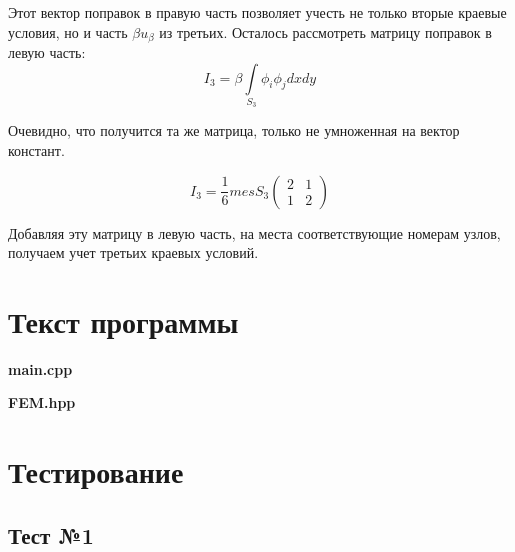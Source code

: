 \documentclass[12pt,a4paper]{article}
\begin{document}
\noindent Этот вектор поправок в правую
часть позволяет учесть не только вторые
краевые условия, но и часть
$\beta u_{\beta}$ из третьих.
Осталось рассмотреть матрицу
поправок в левую часть:
$$
I_3 = \beta \int \limits_{S_3}
\phi_i \phi_j dxdy
$$

\noindent Очевидно, что получится та же
матрица, только не умноженная на вектор
констант.

$$
I_3 = \frac{1}{6} mes S_3
\begin{pmatrix}
    2 & 1 \\
    1 & 2
\end{pmatrix}
$$

\noindent Добавляя эту матрицу в левую часть,
на места соответствующие номерам узлов,
получаем учет третьих краевых условий.


\section{Текст программы}
\begin{myquote}
    \begin{center}
        \textbf{main.cpp}
    \end{center}
\end{myquote}

\begin{myquote}
    \begin{center}
        \textbf{FEM.hpp}
    \end{center}
\end{myquote}


\section{Тестирование}

\subsection*{Тест №1}
\end{document}
